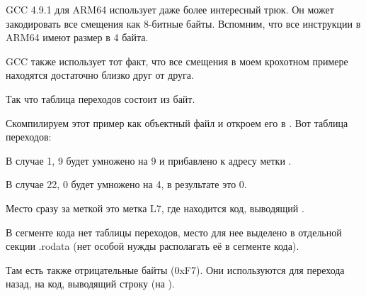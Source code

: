 GCC 4.9.1 для ARM64 использует даже более интересный трюк.
Он может закодировать все смещения как 8-битные байты.
Вспомним, что все инструкции в ARM64 имеют размер в 4 байта.

GCC также использует тот факт, что все смещения в моем крохотном примере находятся достаточно близко друг от друга.

Так что таблица переходов состоит из байт.



Скомпилируем этот пример как объектный файл и откроем его в \IDA. Вот таблица переходов:



В случае 1, 9 будет умножено на 9 и прибавлено к адресу метки .

В случае 22, 0 будет умножено на 4, в результате это 0.

Место сразу за меткой  это метка L7, где находится код, выводящий .

В сегменте кода нет таблицы переходов, место для нее выделено в отдельной секции .rodata
(нет особой нужды располагать её в сегменте кода).

Там есть также отрицательные байты (0xF7). Они используются для перехода назад, на код, выводящий
строку  (на ).

